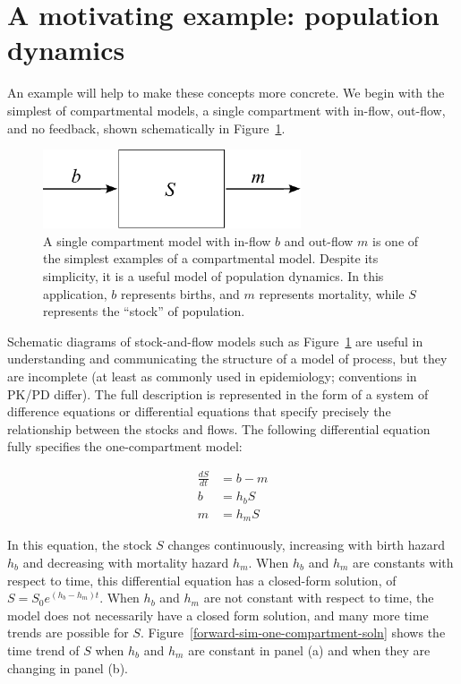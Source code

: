 \section{A motivating example: population dynamics}

An example will help to make these concepts more concrete.  We begin
with the simplest of compartmental models, a single compartment with
in-flow, out-flow, and no feedback, shown schematically in
Figure~\ref{forward-sim-one-compartment}.

\begin{figure}[h]
\begin{center}
\includegraphics[width=3in]{S.pdf}
\caption{A single compartment model with in-flow $b$ and out-flow $m$
  is one of the simplest examples of a compartmental model. Despite
  its simplicity, it is a useful model of population dynamics.  In
  this application, $b$ represents births, and $m$ represents
  mortality, while $S$ represents the ``stock'' of
  population.}
\label{forward-sim-one-compartment}
\end{center}
\end{figure}


Schematic diagrams of stock-and-flow models such as
Figure~\ref{forward-sim-one-compartment} are useful in understanding
and communicating the structure of a model of process, but they are
incomplete (at least as commonly used in epidemiology; conventions in
PK/PD differ). The full description is represented in the form of a
system of difference equations or differential equations that specify
precisely the relationship between the stocks and flows. The following
differential equation fully specifies the one-compartment model:

\begin{align*}
\frac{dS}{dt}&= b - m\\
b&=h_b S\\
m&=h_m S
\end{align*}

In this equation, the stock $S$ changes continuously, increasing with
birth hazard $h_b$ and decreasing with mortality hazard $h_m$. When
$h_b$ and $h_m$ are constants with respect to time, this differential
equation has a closed-form solution, of $S = S_0 e^{(h_b-h_m)t}$. When
$h_b$ and $h_m$ are not constant with respect to time, the model does
not necessarily have a closed form solution, and many more time trends
are possible for $S$.  Figure~\ref{forward-sim-one-compartment-soln}
shows the time trend of $S$ when $h_b$ and $h_m$ are constant in panel
(a) and when they are changing in panel (b).

